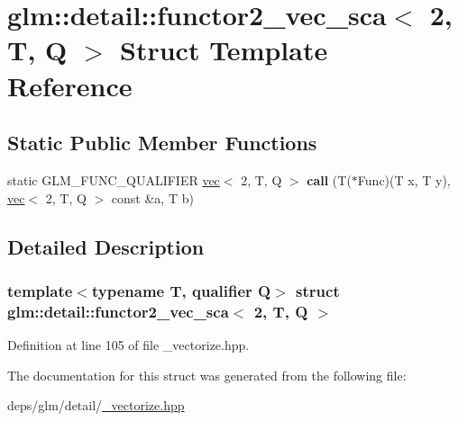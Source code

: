\hypertarget{structglm_1_1detail_1_1functor2__vec__sca_3_012_00_01T_00_01Q_01_4}{}\section{glm\+:\+:detail\+:\+:functor2\+\_\+vec\+\_\+sca$<$ 2, T, Q $>$ Struct Template Reference}
\label{structglm_1_1detail_1_1functor2__vec__sca_3_012_00_01T_00_01Q_01_4}
\subsection*{Static Public Member Functions}
\begin{DoxyCompactItemize}
\item 
\mbox{\label{structglm_1_1detail_1_1functor2__vec__sca_3_012_00_01T_00_01Q_01_4_a706cc99a668c874d6aef44ea579d2901}} 
static G\+L\+M\+\_\+\+F\+U\+N\+C\+\_\+\+Q\+U\+A\+L\+I\+F\+I\+ER \hyperlink{structglm_1_1vec}{vec}$<$ 2, T, Q $>$ {\bfseries call} (T($\ast$Func)(T x, T y), \hyperlink{structglm_1_1vec}{vec}$<$ 2, T, Q $>$ const \&a, T b)
\end{DoxyCompactItemize}


\subsection{Detailed Description}
\subsubsection*{template$<$typename T, qualifier Q$>$\newline
struct glm\+::detail\+::functor2\+\_\+vec\+\_\+sca$<$ 2, T, Q $>$}



Definition at line 105 of file \+\_\+vectorize.\+hpp.



The documentation for this struct was generated from the following file\+:\begin{DoxyCompactItemize}
\item 
deps/glm/detail/\hyperlink{__vectorize_8hpp}{\+\_\+vectorize.\+hpp}\end{DoxyCompactItemize}
